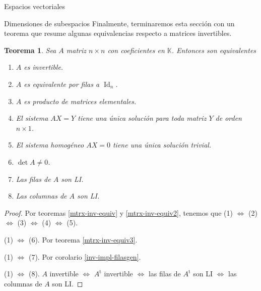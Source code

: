 \documentclass[a4paper,12pt,twoside,spanish,reqno]{amsbook}
\numberwithin{equation}{section}
\newtheorem{teorema}{Teorema}[section]
\theoremstyle{definition}
\theoremstyle{remark}
\newcommand{\Id}{\operatorname{Id}}
\renewcommand{\t}{{\operatorname{t}}}
\newcommand{\K}{\mathbb K}
\begin{document}
\begin{chapter}{Espacios vectoriales}
\begin{section}{Dimensiones de subespacios}
Finalmente, terminaremos esta sección con un teorema que resume algunas equivalencias respecto a matrices invertibles.

\begin{teorema}
    Sea $A$ matriz $n \times n$ con coeficientes en $\K$. Entonces son equivalentes
    \begin{enumerate} 
        \item $A$ es invertible.
        \item $A$  es equivalente por filas a $\Id_n$.
        \item $A$ es producto de matrices elementales.
        \item El sistema $AX=Y$ tiene una única solución para toda matriz $Y$ de orden $n \times 1$. 
        \item El sistema homogéneo $AX=0$ tiene una única solución trivial.
        \item $\det A \ne 0$.
        \item Las filas de $A$ son LI.
        \item Las columnas de $A$ son LI.
    \end{enumerate}
\end{teorema}
\begin{proof} Por teoremas \ref{mtrx-inv-equiv} y  \ref{mtrx-inv-equiv2}, tenemos que 	(1) $\Leftrightarrow$ 	(2) $\Leftrightarrow$ 	(3) $\Leftrightarrow$ 	(4) $\Leftrightarrow$ 	(5).
    
    (1) $\Leftrightarrow$ (6). Por teorema \ref{mtrx-inv-equiv3}.
    
    (1) $\Leftrightarrow$ (7). Por corolario \ref{inv-impl-filasgen}.
    
    (1) $\Leftrightarrow$ (8). $A$ invertible $\Leftrightarrow$ $A^\t$ invertible $\Leftrightarrow$  las filas de $A^\t$ son LI $\Leftrightarrow$  las columnas de $A$ son LI. 
\end{proof}
    
    \end{section}



    \end{chapter}
    
\end{document}
